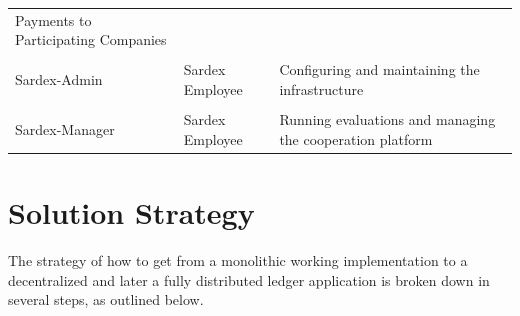 \begin{longtable}[]{@{}lll@{}}
\begin{minipage}[t]{0.37\columnwidth}Payments to Participating Companies\end{minipage}
\tabularnewline
\tabularnewline
\begin{minipage}[t]{0.18\columnwidth}Sardex-Admin \end{minipage} &
\begin{minipage}[t]{0.37\columnwidth}Sardex Employee \end{minipage} &
\begin{minipage}[t]{0.37\columnwidth}Configuring and maintaining the infrastructure\end{minipage}
\tabularnewline
\tabularnewline
\begin{minipage}[t]{0.18\columnwidth}Sardex-Manager \end{minipage} &
\begin{minipage}[t]{0.37\columnwidth}Sardex Employee \end{minipage} &
\begin{minipage}[t]{0.37\columnwidth}Running evaluations and managing the cooperation platform \end{minipage}
\tabularnewline


\bottomrule
\end{longtable}

\section{Solution Strategy}\label{section-solution-strategy}
The strategy of how to get from a monolithic working implementation to a decentralized and later a fully distributed ledger application is broken down in several steps, as outlined below.

